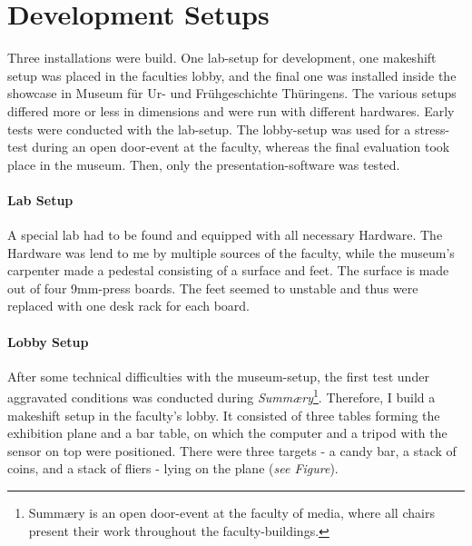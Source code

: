 
%


\section{Development Setups}
\label{setup_development}

Three installations were build. One lab-setup for development, one makeshift setup was placed in the faculties lobby, and the final one was installed inside the showcase in Museum für Ur- und Frühgeschichte Thüringens. The various setups differed more or less in dimensions and were run with different hardwares. Early tests were conducted with the lab-setup. The lobby-setup was used for a stress-test during an open door-event at the faculty, whereas the final evaluation took place in the museum. Then, only the presentation-software was tested.

\paragraph{Lab Setup} A special lab had to be found and equipped with all necessary Hardware. The Hardware was lend to me by multiple sources of the faculty, while the museum's carpenter made a pedestal consisting of a surface and feet. The surface is made out of four 9mm-press boards. The feet seemed to unstable and thus were replaced with one desk rack for each board.


\paragraph{Lobby Setup} After some technical difficulties with the museum-setup, the first test under aggravated conditions was conducted during \textit{Summ\ae{}ry}\footnote{Summ\ae{}ry is an open door-event at the faculty of media, where all chairs present their work throughout the faculty-buildings.}. Therefore, I build a makeshift setup in the faculty's lobby. It consisted of three tables forming the exhibition plane and a bar table, on which the computer and a tripod with the sensor on top were positioned. There were three targets - a candy bar, a stack of coins, and a stack of fliers - lying on the plane (\textit{see Figure}).

